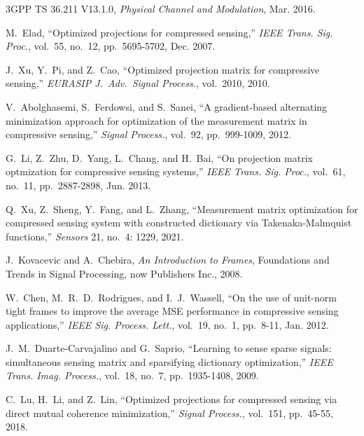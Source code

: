 \documentclass[journal]{IEEEtran}
\numberwithin{const2}{const}
\begin{document}
\begin{thebibliography}{1}
	3GPP TS 36.211 V13.1.0,
	\emph{Physical Channel and Modulation}, Mar. 2016.	
	
		
	M.~Elad,
	``Optimized projections for compressed sensing,''
	\emph{IEEE Trans. Sig. Proc.}, vol.~55, no.~12, pp.~5695-5702, Dec. 2007.
	
	J.~Xu, Y.~Pi, and Z.~Cao,
	``Optimized projection matrix for compressive sensing,''
	\emph{EURASIP J.~Adv.~Signal Process.}, vol.~2010, 2010.
	
	V.~Abolghasemi, S.~Ferdowsi, and S.~Sanei,
	``A gradient-based alternating minimization approach for optimization of the measurement matrix in compressive sensing,''
	\emph{Signal Process.}, vol.~92, pp.~999-1009, 2012.
	
	G.~Li, Z.~Zhu, D.~Yang, L.~Chang, and H.~Bai,
	``On projection matrix optmization for compressive sensing systems,''
	\emph{IEEE Trans. Sig. Proc.}, vol.~61, no.~11, pp.~2887-2898, Jun. 2013.	
	
	Q.~Xu, Z.~Sheng, Y.~Fang, and L.~Zhang,
	``Measurement matrix optimization for compressed sensing system with constructed dictionary via Takenaka-Malmquist functions,''
	\emph{Sensors} 21, no.~4: 1229, 2021. 
	
	
	J.~Kovacevic and A.~Chebira,
	\emph{An Introduction to Frames}, Foundations and Trends in Signal Processing, now Publishers Inc., 2008.
	
	
	W.~Chen, M.~R.~D.~Rodrigues, and I.~J.~Wassell,
	``On the use of unit-norm tight frames to improve the average MSE performance in compressive sensing applications,''
	\emph{IEEE Sig. Process. Lett.}, vol.~19, no.~1, pp.~8-11, Jan. 2012.	
	
	
	
	J.~M.~Duarte-Carvajalino and G.~Saprio,
	``Learning to sense sparse signals: simultaneous sensing matrix and sparsifying dictionary optimization,''
	\emph{IEEE Trans. Imag. Process.}, vol.~18, no.~7, pp.~1935-1408, 2009.
	
	
	C.~Lu, H.~Li, and Z.~Lin,
	``Optimized projections for compressed sensing via direct mutual coherence minimization,''
	\emph{Signal Process.}, vol.~151, pp.~45-55, 2018.
	

\end{thebibliography}
\end{document}

